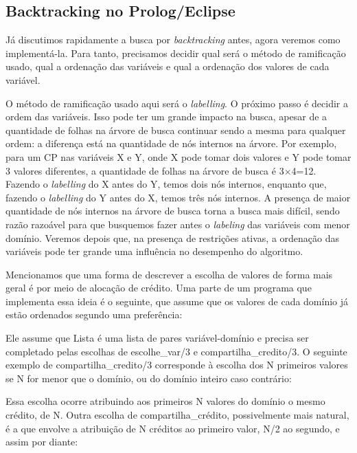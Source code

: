 \documentclass{article}
\begin{document}
\subsection{Backtracking no Prolog/Eclipse}

Já discutimos rapidamente a busca por \textit{backtracking} antes, agora veremos como implementá-la. Para tanto, precisamos decidir qual será o método de ramificação usado, qual a ordenação das variáveis e qual a ordenação dos valores de cada variável.

O método de ramificação usado aqui será o \textit{labelling}. O próximo passo é decidir a ordem das variáveis. Isso pode ter um grande impacto na busca, apesar de a quantidade de folhas na árvore de busca continuar sendo a mesma para qualquer ordem: a diferença está na quantidade de nós internos na árvore. Por exemplo, para um CP nas variáveis X e Y, onde X pode tomar dois valores e Y pode tomar 3 valores diferentes, a quantidade de folhas na árvore de busca é 3$\times$4=12. Fazendo o \textit{labelling}
do X antes do Y, temos dois nós internos, enquanto que, fazendo o \textit{labelling} do Y antes do X, temos três nós internos. A presença de maior quantidade de nós internos na árvore de busca torna a busca mais difícil, sendo razão razoável para que busquemos fazer antes o \textit{labeling} das variáveis com menor domínio. Veremos depois que, na presença de restrições ativas, a ordenação das variáveis pode ter grande uma influência no desempenho do algoritmo.

Mencionamos que uma forma de descrever a escolha de valores de forma mais geral é por meio de alocação de crédito. Uma parte de um programa que implementa essa ideia é o seguinte, que assume que os valores de cada domínio já estão ordenados segundo uma preferência:



Ele assume que Lista é uma lista de pares variável-domínio e precisa ser completado pelas escolhas de escolhe\_var/3 e compartilha\_credito/3. O seguinte exemplo de compartilha\_credito/3 corresponde à escolha dos N primeiros valores se N for menor que o domínio, ou do domínio inteiro caso contrário:



Essa escolha ocorre atribuindo aos primeiros N valores do domínio o mesmo crédito, de N. Outra escolha de compartilha\_crédito, possivelmente mais natural, é a que envolve a atribuição de N créditos ao primeiro valor, N/2 ao segundo, e assim por diante:
\end{document}

